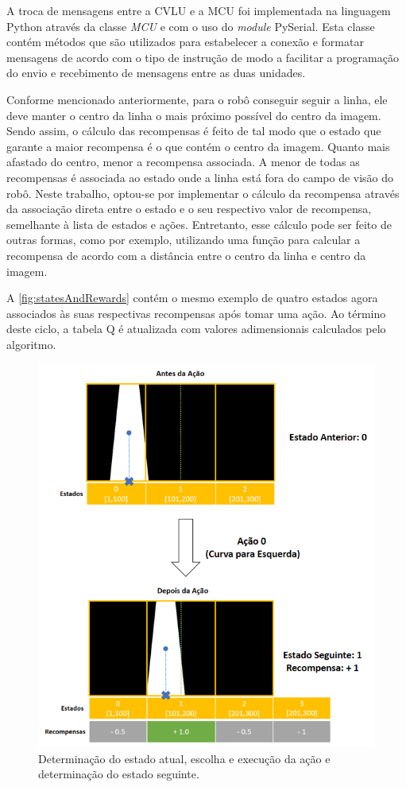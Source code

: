 \documentclass[a4paper]{ifacconf}
\begin{document}
A troca de mensagens entre a CVLU e a MCU foi implementada na linguagem Python através da classe \textit{MCU} e com o uso do \textit{module} PySerial. Esta classe contém métodos que são utilizados para estabelecer a conexão e formatar mensagens de acordo com o tipo de instrução de modo a facilitar a programação do envio e recebimento de mensagens entre as duas unidades.

Conforme mencionado anteriormente, para o robô conseguir seguir a linha, ele deve manter o centro da linha o mais próximo possível do centro da imagem. Sendo assim, o cálculo das recompensas é feito de tal modo que o estado que garante a maior recompensa é o que contém o centro da imagem. Quanto mais afastado do centro, menor a recompensa associada. A menor de todas as recompensas é associada ao estado onde a linha está fora do campo de visão do robô. Neste trabalho, optou-se por implementar o cálculo da recompensa através da associação direta entre o estado e o seu respectivo valor de recompensa, semelhante à lista de estados e ações. Entretanto, esse cálculo pode ser feito de outras formas, como por exemplo, utilizando uma função para calcular a recompensa de acordo com a distância entre o centro da linha e centro da imagem.

A \autoref{fig:statesAndRewards} contém o mesmo exemplo de quatro estados agora associados às suas respectivas recompensas após tomar uma ação. Ao término deste ciclo, a tabela Q é atualizada com valores adimensionais calculados pelo algoritmo.

\begin{figure}
\centering 
\caption{Determinação do estado atual, escolha e execução da ação e determinação do estado seguinte.} \label{fig:statesAndRewards}
\includegraphics[scale=0.55]{Figuras/statesAndRewards.png}
\end{figure} 
\end{document}

